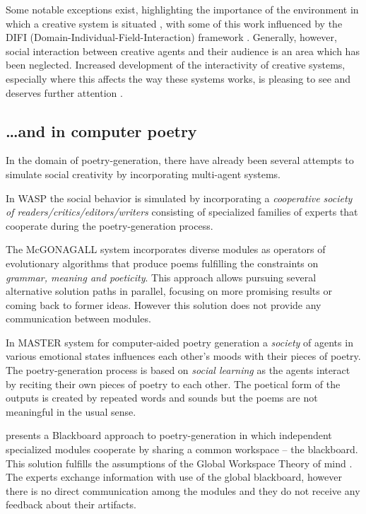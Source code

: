 Some notable exceptions exist, highlighting the importance of the
environment in which a creative system is situated \cite{mcgraw93,
  sosa09, perezyperez10MM, pease10, saunders12}, with some of this
work influenced by the DIFI (Domain-Individual-Field-Interaction)
framework \cite{csik88}. Generally, however, social interaction
between creative agents and their audience is an area which has been
neglected. Increased development of the interactivity of creative
systems, especially where this affects the way these systems works, is
pleasing to see and deserves further attention
\cite{coltonwiggins12}.

\subsection{\ldots and in computer poetry}

In the domain of poetry-generation, there have already been several attempts to simulate social creativity by incorporating multi-agent systems. 

In WASP \cite{gervas01,gervas10}  the social behavior is simulated by incorporating a \emph{cooperative society of readers/critics/editors/writers} consisting of specialized families of experts that cooperate during the poetry-generation process.

The McGONAGALL system \cite{manurung12} incorporates diverse modules as operators of evolutionary algorithms that produce poems fulfilling the constraints on \emph{grammar, meaning and poeticity}.  This approach allows pursuing several alternative solution paths in parallel, focusing on more promising results or coming back to former ideas. However this solution does not provide any communication between modules.

In MASTER system for computer-aided poetry generation \cite{kirke13} a \emph{society} of agents in various emotional states influences each other's moods with their pieces of poetry. The poetry-generation process is based on \emph{social learning} as the agents interact by reciting their own pieces of poetry to each other. The poetical form of the outputs is created by repeated words and sounds but the poems are not meaningful in the usual sense. 

\cite{misztal14} presents a Blackboard approach to poetry-generation in which independent specialized modules cooperate by sharing a common workspace -- the blackboard. This solution fulfills the assumptions of  the Global Workspace Theory of mind  \cite{baars97,baars03}. The experts exchange information with use of the global blackboard, however there is no direct communication among the modules and they do not receive any feedback about their artifacts.


